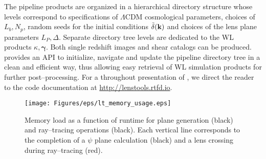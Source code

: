 The pipeline products are organized in a hierarchical directory structure whose levels correspond to specifications of $\Lambda$CDM cosmological parameters, choices of $L_b,N_p$, random seeds for the initial conditions $\tilde{\delta}(\mathbf{k})$ and choices of the lens plane parameters $L_P,\Delta$. Separate directory tree levels are dedicated to the WL products $\kappa,\pmb{\gamma}$. Both single redshift images and shear catalogs can be produced. \LT\, provides an API to initialize, navigate and update the pipeline directory tree in a clean and efficient way, thus allowing easy retrieval of WL simulation products for further post--processing. For a throughout presentation of \LT, we direct the reader to the code documentation at \url{http://lenstools.rtfd.io}. 
\begin{figure}
\begin{center}
\texttt{[image: Figures/eps/lt\_memory\_usage.eps]}
\end{center}
\caption{Memory load as a function of runtime for plane generation (black) and ray--tracing operations (black). Each vertical line corresponds to the completion of a $\psi$ plane calculation (black) and a lens crossing during ray--tracing (red).}
\label{fig:3:lt-memory}
\end{figure}
    

%